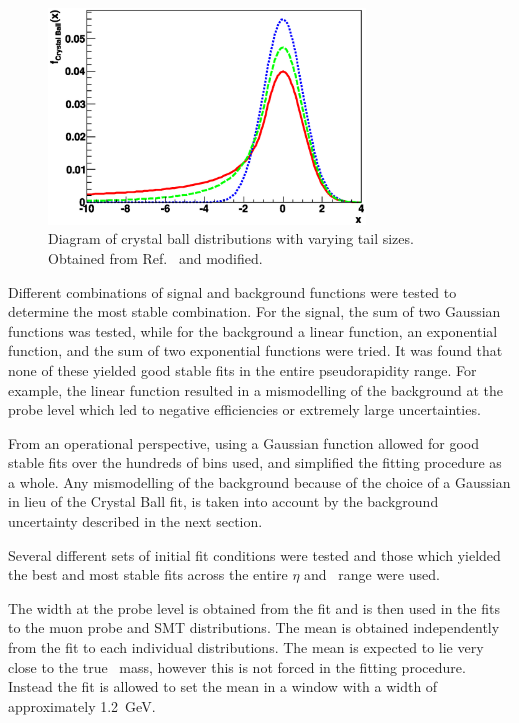 \begin{figure}[htbp]
  \centering
  \includegraphics[width=0.75\textwidth]{PartCalibration2012/Plots/CrystalBallFunction.eps}
  \caption[Diagram of crystal ball distributions with varying tail sizes.]{Diagram of crystal ball distributions with varying tail sizes. Obtained from Ref.~\cite{Calibration:CBFunction} and modified.}\label{fig:CalibrationCBDist}
\end{figure}

Different combinations of signal and background functions were tested to determine the most stable combination. For the signal, the sum of two Gaussian functions was tested, while for the background a linear function, an exponential function, and the sum of two exponential functions were tried. It was found that none of these yielded good stable fits in the entire pseudorapidity range. For example, the linear function resulted in a mismodelling of the background at the probe level which led to negative efficiencies or extremely large uncertainties. 

From an operational perspective, using a Gaussian function allowed for good stable fits over the hundreds of bins used, and simplified the fitting procedure as a whole. Any mismodelling of the background because of the choice of a Gaussian in lieu of the Crystal Ball fit, is taken into account by the background uncertainty described in the next section.

Several different sets of initial fit conditions were tested and those which yielded the best and most stable fits across the entire $\eta$ and \pt\ range were used. 

The width at the probe level is obtained from the fit and is then used in the fits to the muon probe and SMT distributions. The mean is obtained independently from the fit to each individual distributions. The mean is expected to lie very close to the true \jpsi\ mass, however this is not forced in the fitting procedure. Instead the fit is allowed to set the mean in a window with a width of approximately \SI{1.2}{\GeV}. 

